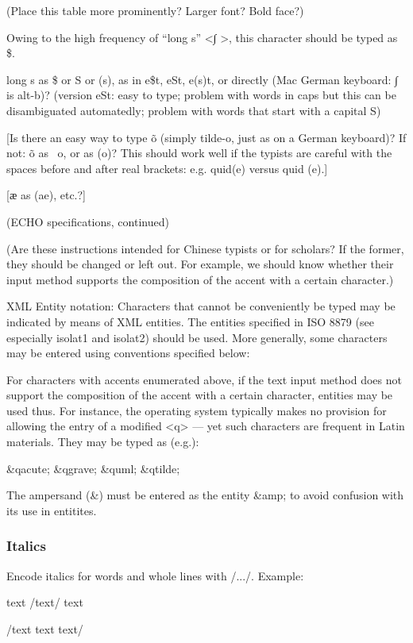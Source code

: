 (Place this table more prominently? Larger font? Bold face?)

Owing to the high frequency of “long s” <∫ >, this character should be typed as \$. 

long s as \$ or S or (s), as in e\$t, eSt, e(s)t, or directly (Mac German keyboard: ∫ is alt-b)? (version eSt: easy to type; problem with words in caps but this can be disambiguated automatedly; problem with words that start with a capital S)

[Is there an easy way to type õ (simply tilde-o, just as on a German keyboard)? If not: õ as ~o, or as (o)? This should work well if the typists are careful with the spaces before and after real brackets: e.g. quid(e) versus quid (e).]

[ӕ as (ae), etc.?]


(ECHO specifications, continued)

(Are these instructions intended for Chinese typists or for scholars? If the former, they should be changed or left out. For example, we should know whether their input method supports  the composition of the accent with a certain character.)

XML Entity notation: Characters that cannot be conveniently be typed may be indicated by means of XML entities. The entities specified in ISO 8879 (see especially isolat1 and isolat2) should be used. More generally, some characters may be entered using conventions specified below:

For characters with accents enumerated above, if the text input method does not support the composition of the accent with a certain character, entities may be used thus. For instance, the operating system typically makes no provision for allowing the entry of a modified <q> — yet such characters are frequent in Latin materials. They may be typed as (e.g.):

\qquad \&qacute; \&qgrave; \&quml; \&qtilde; 

The ampersand (\&) must be entered as the entity \&amp; to avoid confusion with its use in entitites.


\subsubsection{Italics}

Encode italics for words and whole lines with /.../. Example:

text /text/ text

/text text text/

